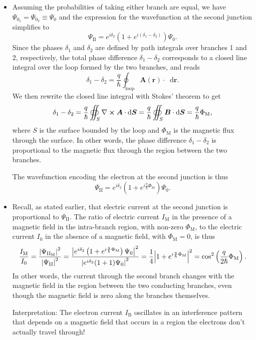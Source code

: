 \documentclass[11pt, a4paper]{article}
\newcommand{\diff}{\mathop{}\!\mathrm{d}} %
\renewcommand{\curl}{\nabla \cross}
\renewcommand{\vec}[1]{\bm{#1}}  %
\renewcommand{\r}{\vec{r}}  %
\newcommand{\A}{\vec{A}}  %
\newcommand{\B}{\vec{B}}  %
\renewcommand{\P}{\Psi}  %
\begin{document}
\begin{itemize}
	\item Assuming the probabilities of taking either branch are equal, we have $ \P_{0_{1}} = \P_{0_{2}} \equiv \P_{0} $ and the expression for the wavefunction at the second junction simplifies to
	\begin{equation*}
		\P_{\text{II}} = e^{i\delta_{2}}\left(1 + e^{i(\delta_{1} - \delta_{2})}\right)\P_{0}.
	\end{equation*}
	Since the phases $ \delta_{1} $ and $\delta_{2} $ are defined by path integrals over branches 1 and 2, respectively, the total phase difference $ \delta_{1} - \delta_{2} $ corresponds to a closed line integral over the loop formed by the two branches, and reads
	\begin{equation*}
		\delta_{1} - \delta_{2} = \frac{q}{\hbar} \oint_{\text{loop}} \A(\r) \cdot \diff \r.
	\end{equation*}
	We then rewrite the closed line integral with Stokes' theorem to get
	\begin{equation*}
		\delta_{1} - \delta_{2} = \frac{q}{\hbar} \oiint_{S}\curl \A \cdot \diff \vec{S} = \frac{q}{\hbar}\oiint_{S} \B \cdot \diff \vec{S} = \frac{q}{\hbar}\Phi_{\text{M}},
	\end{equation*}
	where $ S $ is the surface bounded by the loop and $ \Phi_{\text{M}} $ is the magnetic flux through the surface. In other words, the phase difference $ \delta_{1} - \delta_{2} $ is proportional to the magnetic flux through the region between the two branches.
	
	The wavefunction encoding the electron at the second junction is thus
	\begin{equation*}
		\P_{\text{II}} = e^{i\delta_{2}}\left(1 + e^{i\frac{q}{\hbar}\Phi_{\text{M}}}\right)\P_{0}.
	\end{equation*}
	
	\item Recall, as stated earlier, that electric current at the second junction is proportional to $ \Psi_{\text{II}} $. The ratio of electric current $ I_{\text{M}} $ in the presence of a magnetic field in the intra-branch region, with non-zero $ \Phi_{\text{M}} $, to the electric current $ I_{0} $ in the absence of a magnetic field, with $ \Phi_{\text{M}} = 0 $, is thus
	\begin{equation*}
		\frac{I_{\text{M}}}{I_{0}} = \frac{\abs{\P_{\text{II}_{\text{M}}}}^{2}}{\abs{\P_{\text{II}}}^{2}} = \frac{\abs{e^{i\delta_{2}}\left(1 + e^{i\frac{q}{\hbar}\Phi_{\text{M}}}\right)\P_{0}}^{2}}{\abs{e^{i\delta_{2}}(1 + 1)\P_{0}}^{2}} = \frac{1}{4}\abs{1 + e^{i\frac{q}{\hbar}\Phi_{\text{M}}}}^{2} = \cos^{2}\left(\frac{q}{2\hbar}\Phi_{\text{M}}\right).
	\end{equation*}
	In other words, the current through the second branch changes with the magnetic field in the region between the two conducting branches, even though the magnetic field is zero along the branches themselves. 
	
	Interpretation: The electron current $ I_{\text{B}} $ oscillates in an interference pattern that depends on a magnetic field that occurs in a region the electrons don't actually travel through!
\end{itemize}
\end{document}
